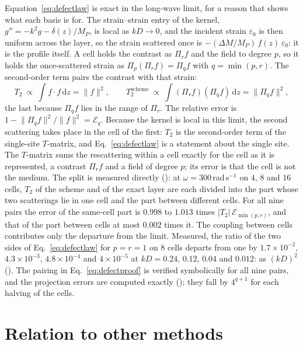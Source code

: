 \documentclass[preprint,review,12pt]{elsarticle}
\newcommand{\dd}{\mathrm{d}}
\begin{document}
Equation~\eqref{eq:defectlaw} is exact in the long-wave limit, for a reason that shows what each basis
is for. The strain--strain entry of the kernel, $g''=-k^2g-\delta(z)/M_P$, is local as $kD\to0$, and the
incident strain $\varepsilon_0$ is then uniform across the layer, so the strain scattered once is
$-(\Delta M/M_P)\,f(z)\,\varepsilon_0$: it is the profile itself. A cell holds the contrast as
$\Pi_rf$ and the field to degree $p$, so it holds the once-scattered strain as
$\Pi_p(\Pi_rf)=\Pi_qf$ with $q=\min(p,r)$. The second-order term pairs the contrast with that strain:
\begin{equation}\label{eq:defectproof}
  T_2\ \propto\ \int f\cdot f\,\dd z=\lVert f\rVert^2,\qquad
  T_2^{\text{scheme}}\ \propto\ \int(\Pi_rf)(\Pi_qf)\,\dd z=\lVert\Pi_qf\rVert^2,
\end{equation}
the last because $\Pi_qf$ lies in the range of $\Pi_r$. The relative error is
$1-\lVert\Pi_qf\rVert^2/\lVert f\rVert^2=\mathcal{E}_q$. Because the kernel is local in this limit, the
second scattering takes place in the cell of the first: $T_2$ is the second-order term of the
single-site $T$-matrix, and Eq.~\eqref{eq:defectlaw} is a statement about the single site. The
$T$-matrix sums the rescattering within a cell exactly for the cell as it is represented, a contrast
$\Pi_rf$ and a field of degree $p$; its error is that the cell is not the medium. The split is measured directly
(): at $\omega=300$\,rad\,s$^{-1}$ on $4$, $8$ and $16$ cells, $T_2$
of the scheme and of the exact layer are each divided into the part whose two scatterings lie in one cell
and the part between different cells. For all nine pairs the error of the same-cell part is $0.998$ to
$1.013$ times $\lvert T_2\rvert\,\mathcal{E}_{\min(p,r)}$, and that of the part between cells at most
$0.002$ times it. The coupling between cells contributes only the departure from the limit. Measured, the ratio of the two sides of
Eq.~\eqref{eq:defectlaw} for $p=r=1$ on $8$ cells departs from one by $1.7\times10^{-2}$,
$4.3\times10^{-3}$, $4.8\times10^{-4}$ and $4\times10^{-5}$ at $kD=0.24$, $0.12$, $0.04$ and $0.012$: as
$(kD)^2$ (). The pairing in Eq.~\eqref{eq:defectproof} is verified
symbolically for all nine pairs, and the projection errors are computed exactly
(); they fall by $4^{q+1}$ for each halving of the cells.

\FloatBarrier

\section{Relation to other methods}\label{app:related}
\end{document}
